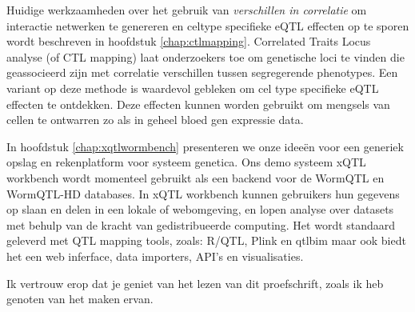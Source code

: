 Huidige werkzaamheden over het gebruik van \emph{verschillen in correlatie} om interactie 
netwerken te genereren en celtype specifieke eQTL effecten op te sporen wordt beschreven in 
hoofdstuk \ref{chap:ctlmapping}. Correlated Traits Locus analyse (of CTL mapping) laat 
onderzoekers toe om genetische loci te vinden die geassocieerd zijn met correlatie verschillen 
tussen segregerende phenotypes. Een variant op deze methode is waardevol gebleken om cel 
type specifieke eQTL effecten te ontdekken. Deze effecten kunnen worden gebruikt om mengsels 
van cellen te ontwarren zo als in geheel bloed gen expressie data.

In hoofdstuk \ref{chap:xqtlwormbench} presenteren we onze idee\"en voor een generiek opslag en rekenplatform 
voor systeem genetica. Ons demo systeem xQTL workbench wordt momenteel gebruikt als een 
backend voor de WormQTL en WormQTL-HD databases. In xQTL workbench kunnen gebruikers hun 
gegevens op slaan en delen in een lokale of webomgeving, en lopen analyse over datasets met 
behulp van de kracht van gedistribueerde computing. Het wordt standaard geleverd met QTL 
mapping tools, zoals: R/QTL, Plink en qtlbim maar ook biedt het een web inferface, data 
importers, API's en visualisaties.

Ik vertrouw erop dat je geniet van het lezen van dit proefschrift, zoals ik heb genoten van het maken 
ervan.

\newpage

